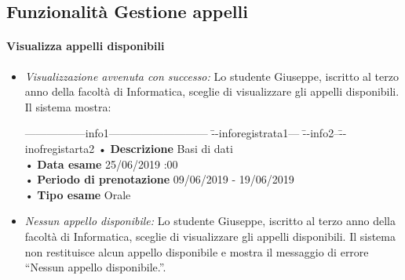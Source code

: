 \subsection{Funzionalità Gestione appelli}
\paragraph{Visualizza appelli disponibili}
\begin{itemize}
	\item \textit{Visualizzazione avvenuta con successo:}
	Lo studente Giuseppe, iscritto al terzo anno della facoltà di Informatica, sceglie di visualizzare gli appelli disponibili. Il sistema mostra:
	\begin{tabbing}
		\hspace{1cm}-----------------info1--------------------------- \= --inforegistrata1--- \= --info2--\=--inofregistarta2 \kill
		\hspace{1cm} • \textbf{Descrizione} Basi di dati \\
		\hspace{1cm} • \textbf{Data esame} 25/06/2019 :00 \\
		\hspace{1cm} • \textbf{Periodo di prenotazione} 09/06/2019 - 19/06/2019 \\
		\hspace{1cm} •  \textbf{Tipo esame} Orale \\
	\end{tabbing}
	
	\item \textit{Nessun appello disponibile:}
	Lo studente Giuseppe, iscritto al terzo anno della facoltà di Informatica, sceglie di visualizzare gli appelli disponibili. Il sistema non restituisce alcun appello disponibile e mostra il messaggio di errore “Nessun appello disponibile.”.
\end{itemize}

